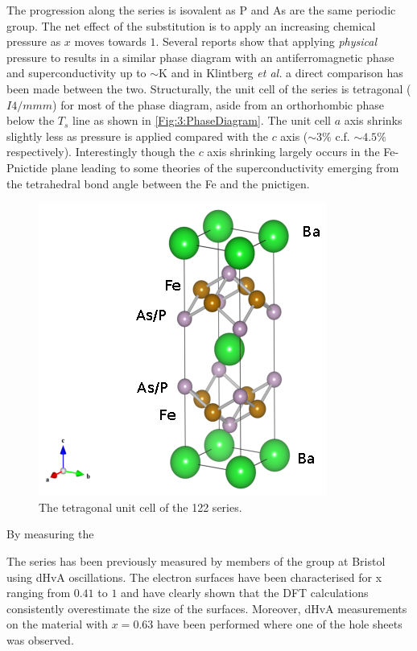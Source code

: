  The progression along the series is isovalent as P and As are the same periodic group. The net effect of the substitution is to apply an increasing chemical pressure as $x$ moves towards $1$. Several reports show that applying \textit{physical} pressure to \BaFeAs results in a similar phase diagram with an antiferromagnetic phase and superconductivity up to $\sim$\unit[30]{K}\cite{Yamazaki2010,Colombier2009,Alireza2009} and in Klintberg \textit{et al.}\cite{Klintberg2010} a direct comparison has been made between the two. 
Structurally, the unit cell of the series is tetragonal ($I4/mmm$) for most of the phase diagram, aside from an orthorhombic phase below the $T_s$ line as shown in \fig\ref{Fig:3:PhaseDiagram}. The unit cell $a$ axis shrinks slightly less as pressure is applied compared with the $c$ axis ($\sim3\%$ c.f. $\sim4.5\%$ respectively). Interestingly though the $c$ axis shrinking largely occurs in the Fe-Pnictide plane leading to some theories of the superconductivity emerging from the tetrahedral bond angle between the Fe and the pnictigen.

\begin{figure}
    \begin{center}
        \includegraphics[scale=0.7]{Chapter3-dHvABaFe2P2/Figures/BaFe2P2Series/UnitCell/UnitCell}
        \caption{The tetragonal unit cell of the 122 \BaFeAsP series.}
        \label{Fig:3:UnitCell}
    \end{center}
\end{figure}

By measuring the 

The \BaFePAs series has been previously measured by members of the group at Bristol using dHvA oscillations\cite{Shishido2010}. The electron surfaces have been characterised for x ranging from $0.41$ to $1$ and have clearly shown that the DFT calculations consistently overestimate the size of the surfaces. Moreover, dHvA measurements on the material with $x=0.63$ have been performed where one of the hole sheets was observed\cite{Analytis2010c}.
